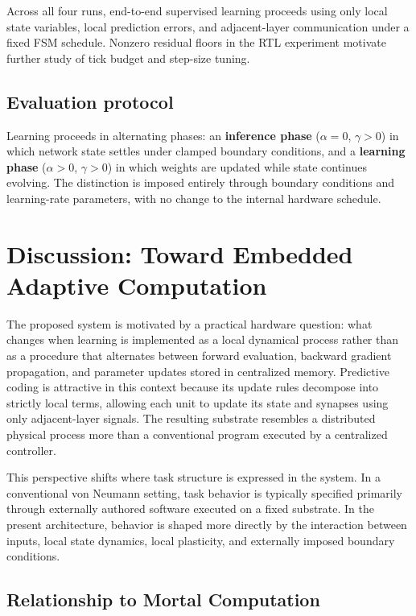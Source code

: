 \documentclass{article}
\begin{document}
Across all four runs, end-to-end supervised learning proceeds using only local
state variables, local prediction errors, and adjacent-layer communication
under a fixed FSM schedule. Nonzero residual floors in the RTL experiment
motivate further study of tick budget and step-size tuning.

\subsection{Evaluation protocol}

Learning proceeds in alternating phases: an \textbf{inference phase}
(\(\alpha = 0\), \(\gamma > 0\)) in which network state settles under clamped
boundary conditions, and a \textbf{learning phase} (\(\alpha > 0\),
\(\gamma > 0\)) in which weights are updated while state continues evolving.
The distinction is imposed entirely through boundary conditions and
learning-rate parameters, with no change to the internal hardware schedule.

\section{Discussion: Toward Embedded Adaptive Computation}
\label{sec:discussion}

The proposed system is motivated by a practical hardware question: what changes when learning is implemented as a local dynamical process rather than as a procedure that alternates between forward evaluation, backward gradient propagation, and parameter updates stored in centralized memory. Predictive coding is attractive in this context because its update rules decompose into strictly local terms, allowing each unit to update its state and synapses using only adjacent-layer signals. The resulting substrate resembles a distributed physical process more than a conventional program executed by a centralized controller.

This perspective shifts where task structure is expressed in the system. In a conventional von Neumann setting, task behavior is typically specified primarily through externally authored software executed on a fixed substrate. In the present architecture, behavior is shaped more directly by the interaction between inputs, local state dynamics, local plasticity, and externally imposed boundary conditions.

\subsection{Relationship to Mortal Computation}
\end{document}
